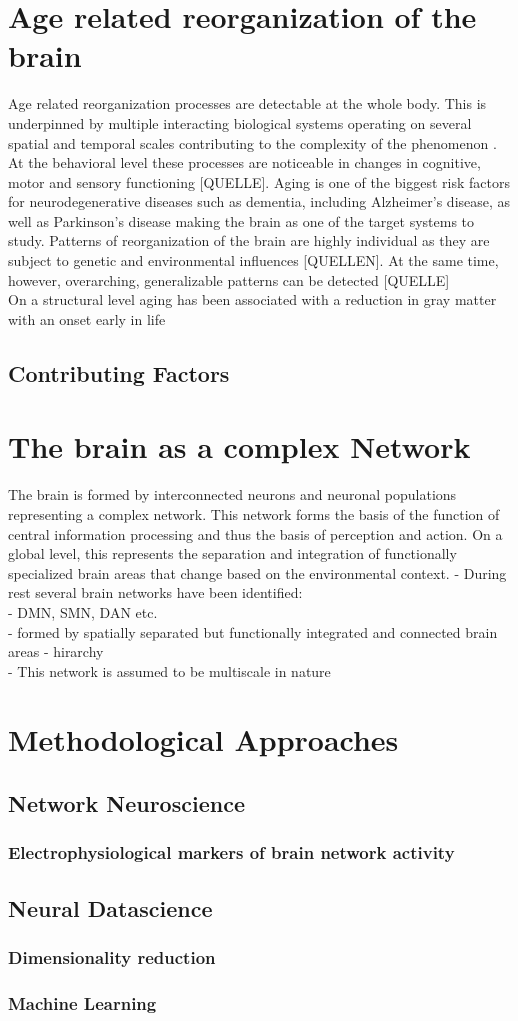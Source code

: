\section{Age related reorganization of the brain}
Age related reorganization processes are detectable at the whole body. This is underpinned by multiple interacting biological systems operating on several spatial and temporal scales contributing to the complexity of the phenomenon \cite{Mooney2016}. At the behavioral level these processes are noticeable in changes in cognitive, motor and sensory functioning [QUELLE]. Aging is one of the biggest risk factors for neurodegenerative diseases such as dementia, including Alzheimer's disease, as well as Parkinson's disease making the brain as one of the target systems to study. Patterns of reorganization of the brain are highly individual as they are subject to genetic and environmental influences [QUELLEN]. At the same time, however, overarching, generalizable patterns can be detected [QUELLE]\\
On a structural level aging has been associated with a reduction in gray matter with an onset early in life 

  

\subsection{Contributing Factors}
\section{The brain as a complex Network}
The brain is formed by interconnected neurons and neuronal populations representing a complex network. This network forms the basis of the function of central information processing and thus the basis of perception and action. On a global level, this represents the separation and integration of functionally specialized brain areas that change based on the environmental context.
- During rest several brain networks have been identified:\\
- DMN, SMN, DAN etc. \\
- formed by spatially separated but functionally integrated and connected brain areas
- hirarchy\\
- This network is assumed to be multiscale in nature \\


\section{Methodological Approaches}
\subsection{Network Neuroscience}
\subsubsection{Electrophysiological markers of brain network activity}
\subsection{Neural Datascience}
\subsubsection{Dimensionality reduction}
\subsubsection{Machine Learning}
